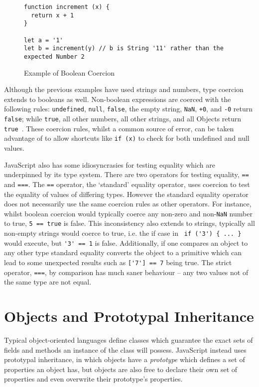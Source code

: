 \documentclass[]{final_report}
\begin{document}
\begin{figure}[t]
\begin{verbatim}
function increment (x) {
  return x + 1
}

let a = '1'
let b = increment(y) // b is String '11' rather than the expected Number 2
\end{verbatim}
\caption{\label{fig:js-increment-concat} Example of Boolean Coercion}
\end{figure} 

Although the previous examples have used strings and numbers, type coercion extends to booleans as well. Non-boolean expressions are coerced with the following rules: \lstinline|undefined|, \lstinline|null|, \lstinline|false|, the empty string, \lstinline|NaN|, \lstinline|+0|, and \lstinline|-0| return \lstinline|false|; while \lstinline|true|, all other numbers, all other strings, and all Objects return \lstinline|true|~\cite{EcmaScript}. These coercion rules, whilst a common source of error, can be taken advantage of to allow shortcuts like \lstinline|if (x)| to check for both undefined and null values.

JavaScript also has some idiosyncrasies for testing equality which are underpinned by its type system. There are two operators for testing equality, \lstinline|==| and \lstinline|===|. The \lstinline|==| operator, the `standard' equality operator, uses coercion to test the equality of values of differing types. However the standard equality operator does not necessarily use the same coercion rules as other operators. For instance, whilst boolean coercion would typically coerce any non-zero and non-\lstinline{NaN} number to true, \lstinline{5 == true} is false. This inconsistency also extends to strings, typically all non-empty strings would coerce to true, i.e. the if case in \lstinline| if ('3') { ... }| would execute, but \lstinline{'3' == 1} is false. Additionally, if one compares an object to any other type standard equality converts the object to a primitive which can lead to some unexpected results such as \lstinline{['7'] == 7}  being true. The strict operator, \lstinline{===}, by comparison has much saner behaviour -- any two values not of the same type are not equal.

\section{Objects and Prototypal Inheritance}
Typical object-oriented languages define classes which guarantee the exact sets of fields and methods an instance of the class will possess. JavaScript instead uses prototypal inheritance, in which objects have a \textit{prototype} which defines  a set of properties an object has, but objects are also free to declare their own set of properties and even overwrite their prototype's properties. 
\end{document}
